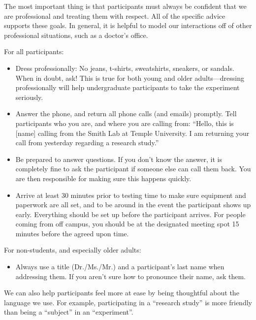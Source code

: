 \documentclass[letterpaper,12pt,oneside]{memoir}
\begin{document}
The most important thing is that participants must always be confident that we are professional and treating them with respect. All of the specific advice supports these goals. In general, it is helpful to model our interactions off of other professional situations, such as a doctor's office.

For all participants:

\begin{itemize}

\item Dress professionally: No jeans, t-shirts, sweatshirts, sneakers, or sandals. When in doubt, ask! This is true for both young and older adults---dressing professionally will help undergraduate participants to take the experiment seriously.

\item Answer the phone, and return all phone calls (and emails) promptly. Tell participants who you are, and where you are calling from: ``Hello, this is [name] calling from the Smith Lab at Temple University. I am returning your call from yesterday regarding a research study.''

\item Be prepared to answer questions. If you don't know the answer, it is completely fine to ask the participant if someone else can call them back. You are then responsible for making sure this happens quickly.

\item Arrive at least 30 minutes prior to testing time to make sure equipment and paperwork are all set, and to be around in the event the participant shows up early. Everything should be set up before the participant arrives. For people coming from off campus, you should be at the designated meeting spot 15 minutes before the agreed upon time.

\end{itemize}
	
For non-students, and especially older adults:

\begin{itemize}
\item Always use a title (Dr./Ms./Mr.) and a participant's last name when addressing them. If you aren't sure how to pronounce their name, ask them.
\end{itemize}

We can also help participants feel more at ease by being thoughtful about the language we use. For example, participating in a ``research study'' is more friendly than being a ``subject'' in an ``experiment''.
\end{document}
